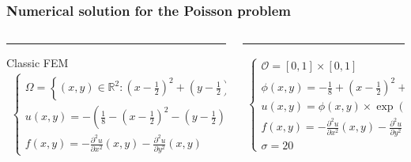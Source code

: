 \begin{frame}
    \frametitle{Numerical solution for the Poisson problem}

    \begin{columns}[T] %
        \begin{column}{.48\textwidth}
        \color{purple}\rule{\linewidth}{4pt}
        Classic FEM \color{black}
        \begin{align*}
            \begin{cases}
            \Omega = \left\{ (x,y)\in\mathbb{R}^2: \left( x-\frac{1}{2} \right)^2 + \left( y-\frac{1}{2} \right)^2 < \frac{1}{8}  \right\} \\
            u(x,y)= -\left( \frac{1}{8} - \left( x-\frac{1}{2} \right)^2 - \left( y-\frac{1}{2} \right)^2 \right) \exp(x) \sin(2\pi y)\\
            f(x,y) = -\frac{\partial^2 u}{\partial x^2}(x,y) -\frac{\partial^2 u}{\partial y^2}(x,y)
            \end{cases}
        \end{align*}
        
        \end{column}%
        \hfill%
        \begin{column}{.48\textwidth}
        \color{orange}\rule{\linewidth}{4pt}
        \phifem \color{black}
        \begin{align*}
            \begin{cases}
            \mathcal{O} = [0,1]\times[0,1] \\
            \phi(x,y) = -\frac{1}{8} + \left( x-\frac{1}{2} \right)^2 + \left( y-\frac{1}{2} \right)^2 \\
            u(x,y)=\phi(x,y) \times \exp(x) \times \sin(2\pi y) \\
            f(x,y) = -\frac{\partial^2 u}{\partial x^2}(x,y) -\frac{\partial^2 u}{\partial y^2}(x,y) \\
            \sigma = 20
            \end{cases}
        \end{align*}
        
        \end{column}%
    \end{columns}

    \pause


\end{frame}
